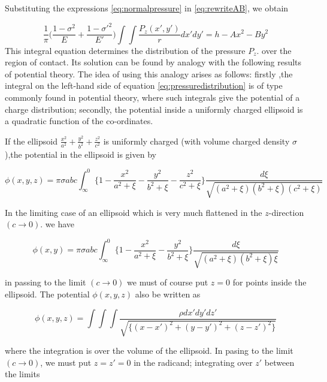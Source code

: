 Substituting the expressions \ref{eq:normalpressure} in \ref{eq:rewriteAB}, we obtain

\begin{equation}
\frac{1}{\pi}\Big(\frac{1-\sigma^{2}}{E}+\frac{1-\sigma'^{2}}{E'}\Big)\int\int\frac{P_{z}(x',y')}{r}dx'dy' = h-Ax^{2}-By^{2}
\label{eq:pressuredistribution}
\end{equation}
This integral equation determines the distribution of the pressure $P_{z}$. over the region of contact. Its solution can be found by analogy with the following results of potential theory. The idea of using this analogy arises as follows:
firstly ,the integral on the left-hand side of equation \ref{eq:pressuredistribution} is of type commonly found in potential theory, where such integrals give the potential of a
charge distribution; secondly, the potential inside a uniformly charged ellipsoid is a quadratic function of the co-ordinates.

If the ellipsoid $\frac{x^{2}}{a^{2}}+\frac{y^{2}}{b^{2}}+\frac{z^{2}}{c^{2}}$ is uniformly charged (with volume
charged density $\sigma$),the potential in the ellipsoid is given by


\begin{equation}
\phi(x,y,z) = \pi\sigma abc\int_{\infty}^{0} \Big\{ 1-\frac{x^{2}}{a^{2}+\xi} - \frac{y^{2}}{b^{2}+\xi} - \frac{z^{2}}{c^{2}+\xi} \Big\} \frac{d\xi}{\sqrt{(a^{2}+\xi)(b^{2}+\xi)(c^{2}+\xi)}}
\end{equation}
%

In the limiting case of an ellipsoid which is very much flattened in the $z$-direction $(c\rightarrow0)$. we have

\begin{equation}
\phi(x,y) = \pi\sigma abc\int_{\infty}^{0} \Big\{ 1-\frac{x^{2}}{a^{2}+\xi} - \frac{y^{2}}{b^{2}+\xi} \Big\} \frac{d\xi}{\sqrt{(a^{2}+\xi)(b^{2}+\xi)\xi}}
\end{equation}

in passing to the limit $(c\rightarrow0)$ we must of course put $z=0$ for points inside the ellipsoid. The potential $\phi(x,y,z)$ also be written as

\begin{equation}
\phi(x,y,z) = \int\int\int\frac{\rho dx'dy'dz'}{\sqrt{\{(x-x')^{2}+(y-y')^{2}+(z-z')^{2}\}}}
\end{equation}

where the integration is over the volume of the ellipsoid. In pasing to the limit $(c\rightarrow0)$, we must put $z=z'=0$ in the radicand; integrating over $z'$ between the limits

